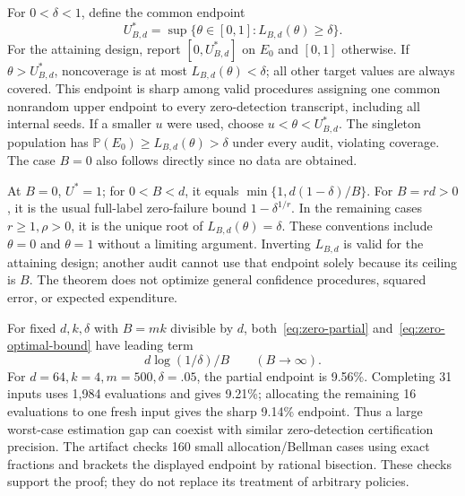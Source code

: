 \documentclass[conference]{IEEEtran}
\newcommand{\Prob}{\mathbb{P}}
\begin{document}
For $0<\delta<1$, define the common endpoint
\begin{equation}\label{eq:zero-optimal-bound}
 U^*_{B,d}=\sup\{\theta\in[0,1]:L_{B,d}(\theta)\geq\delta\}.
\end{equation}
For the attaining design, report $[0,U^*_{B,d}]$ on $E_0$ and $[0,1]$ otherwise. If $\theta>U^*_{B,d}$, noncoverage is at most $L_{B,d}(\theta)<\delta$; all other target values are always covered. This endpoint is sharp among valid procedures assigning one common nonrandom upper endpoint to every zero-detection transcript, including all internal seeds. If a smaller $u$ were used, choose $u<\theta<U^*_{B,d}$. The singleton population has $\Prob(E_0)\geq L_{B,d}(\theta)>\delta$ under every audit, violating coverage. The case $B=0$ also follows directly since no data are obtained.

At $B=0$, $U^*=1$; for $0<B<d$, it equals $\min\{1,d(1-\delta)/B\}$. For $B=rd>0$, it is the usual full-label zero-failure bound $1-\delta^{1/r}$. In the remaining cases $r\geq1,\rho>0$, it is the unique root of $L_{B,d}(\theta)=\delta$. These conventions include $\theta=0$ and $\theta=1$ without a limiting argument. Inverting $L_{B,d}$ is valid for the attaining design; another audit cannot use that endpoint solely because its ceiling is $B$. The theorem does not optimize general confidence procedures, squared error, or expected expenditure.

For fixed $d,k,\delta$ with $B=mk$ divisible by $d$, both~\eqref{eq:zero-partial} and~\eqref{eq:zero-optimal-bound} have leading term
\begin{equation}\label{eq:zero-rate}
 d\log(1/\delta)/B\qquad(B\to\infty).
\end{equation}
For $d=64,k=4,m=500,\delta=.05$, the partial endpoint is 9.56\%. Completing 31 inputs uses 1,984 evaluations and gives 9.21\%; allocating the remaining 16 evaluations to one fresh input gives the sharp 9.14\% endpoint. Thus a large worst-case estimation gap can coexist with similar zero-detection certification precision. The artifact checks 160 small allocation/Bellman cases using exact fractions and brackets the displayed endpoint by rational bisection. These checks support the proof; they do not replace its treatment of arbitrary policies.
\end{document}
